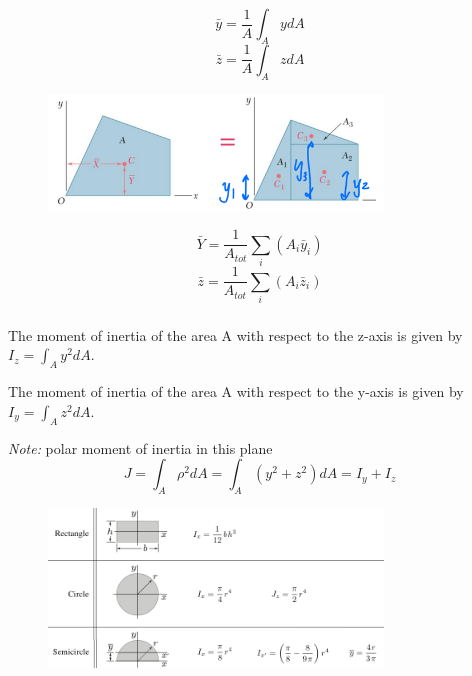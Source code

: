 \[\bar{y} = \frac{1}{A}\int_A y dA\] 
\[\bar{z} = \frac{1}{A}\int_A z dA\]

\noindent {}

\begin{figure}[!h]
\centering
\includegraphics[angle=0, width=3.5in]{Bending-Figures/CompositeCentroid.png}
\vspace{-2mm}
\caption{\small {}}
\vspace{-3mm}
\label{Fig:CompCentroid}
\end{figure}

\[\bar{Y} = \frac{1}{A_{tot}}\sum_i (A_i\bar{y}_i)\] \[\bar{z} = \frac{1}{A_{tot}}\sum_i (A_i\bar{z}_i)\]

\subsubsection{}
The moment of inertia of the area A with respect to the z-axis is given by $I_z = \int_A y^2 dA$.

\vspace{5pt}

\noindent The moment of inertia of the area A with respect to the y-axis is given by $I_y = \int_A z^2 dA$.

\vspace{5pt}

\noindent \textit{Note:}  polar moment of inertia in this plane \[J = \int_A \rho^2 dA = \int_A (y^2 + z^2)dA = I_y + I_z\]

\begin{figure}[!h]
\centering
\includegraphics[angle=0, width=3.5in]{Bending-Figures/CommonShapes.png}
\vspace{-2mm}
\caption{\small {}}
\vspace{-3mm}
\label{Fig:Common Shapes}
\end{figure}

